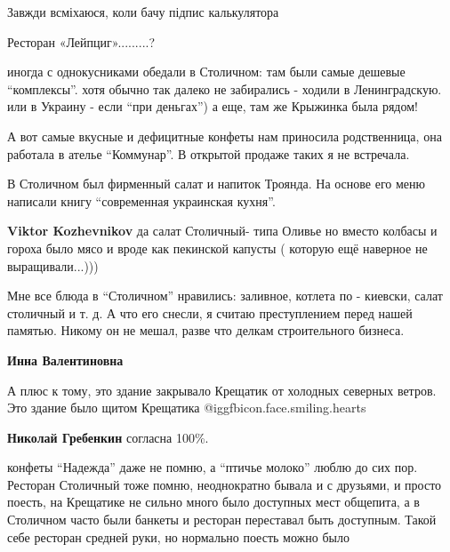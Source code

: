 \begin{itemize}
Завжди всміхаюся, коли бачу підпис калькулятора

Ресторан «Лейпциг».........?


иногда с однокусниками обедали в Столичном: там были самые дешевые \enquote{комплексы}.
хотя обычно так далеко не забирались - ходили в Ленинградскую. или в Украину -
если \enquote{при деньгах}) а еще, там же Крыжинка была рядом!



А вот самые вкусные и дефицитные конфеты нам приносила родственница, она
работала в ателье \enquote{Коммунар}. В открытой продаже таких я не встречала.



В Столичном был фирменный салат и напиток Троянда. На основе его меню написали
книгу \enquote{современная украинская кухня}.

\begin{itemize} %
\textbf{Viktor Kozhevnikov} да салат Столичный- типа Оливье но вместо колбасы и гороха было мясо и вроде как пекинской капусты ( которую ещё наверное не выращивали...)))
\end{itemize} %


Мне все блюда в \enquote{Столичном} нравились: заливное, котлета по - киевски,
салат столичный и т. д. А что его снесли, я считаю преступлением перед нашей
памятью.  Никому он не мешал, разве что делкам строительного бизнеса.

\begin{itemize} %
\textbf{Инна Валентиновна} 

А плюс к тому, это здание закрывало Крещатик от холодных северных ветров. Это
здание было щитом Крещатика @igg{fbicon.face.smiling.hearts} 

\textbf{Николай Гребенкин} согласна 100\%.
\end{itemize} %


конфеты \enquote{Надежда} даже не помню, а \enquote{птичье молоко} люблю до сих пор. Ресторан
Столичный тоже помню, неоднократно бывала и с друзьями, и просто поесть, на
Крещатике не сильно много было доступных мест общепита, а в Столичном часто
были банкеты и ресторан переставал быть доступным. Такой себе ресторан средней
руки, но нормально поесть можно было

\end{itemize} %
